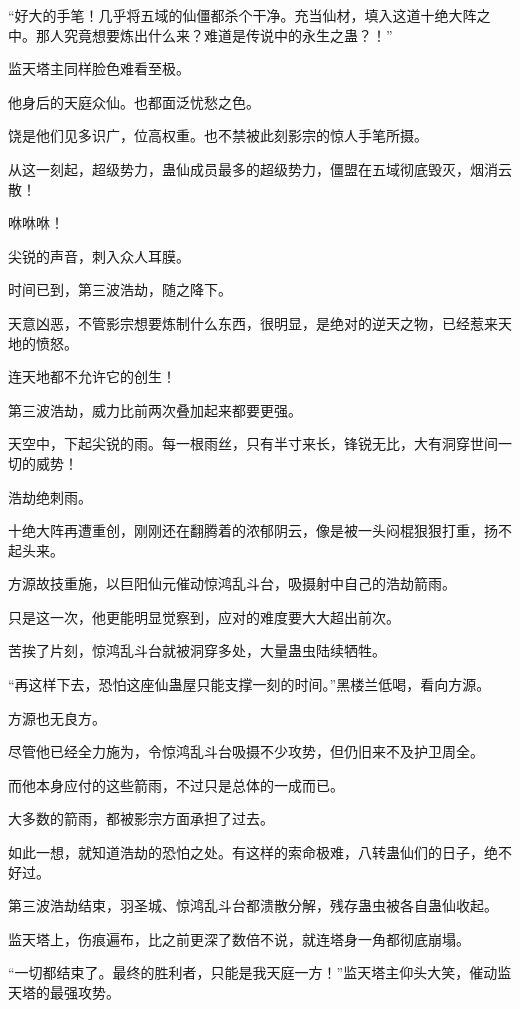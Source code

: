 \begin{this_body}
“好大的手笔！几乎将五域的仙僵都杀个干净。充当仙材，填入这道十绝大阵之中。那人究竟想要炼出什么来？难道是传说中的永生之蛊？！”

监天塔主同样脸色难看至极。

他身后的天庭众仙。也都面泛忧愁之色。

饶是他们见多识广，位高权重。也不禁被此刻影宗的惊人手笔所摄。

从这一刻起，超级势力，蛊仙成员最多的超级势力，僵盟在五域彻底毁灭，烟消云散！

咻咻咻！

尖锐的声音，刺入众人耳膜。

时间已到，第三波浩劫，随之降下。

天意凶恶，不管影宗想要炼制什么东西，很明显，是绝对的逆天之物，已经惹来天地的愤怒。

连天地都不允许它的创生！

第三波浩劫，威力比前两次叠加起来都要更强。

天空中，下起尖锐的雨。每一根雨丝，只有半寸来长，锋锐无比，大有洞穿世间一切的威势！

浩劫绝刺雨。

十绝大阵再遭重创，刚刚还在翻腾着的浓郁阴云，像是被一头闷棍狠狠打重，扬不起头来。

方源故技重施，以巨阳仙元催动惊鸿乱斗台，吸摄射中自己的浩劫箭雨。

只是这一次，他更能明显觉察到，应对的难度要大大超出前次。

苦挨了片刻，惊鸿乱斗台就被洞穿多处，大量蛊虫陆续牺牲。

“再这样下去，恐怕这座仙蛊屋只能支撑一刻的时间。”黑楼兰低喝，看向方源。

方源也无良方。

尽管他已经全力施为，令惊鸿乱斗台吸摄不少攻势，但仍旧来不及护卫周全。

而他本身应付的这些箭雨，不过只是总体的一成而已。

大多数的箭雨，都被影宗方面承担了过去。

如此一想，就知道浩劫的恐怕之处。有这样的索命极难，八转蛊仙们的日子，绝不好过。

第三波浩劫结束，羽圣城、惊鸿乱斗台都溃散分解，残存蛊虫被各自蛊仙收起。

监天塔上，伤痕遍布，比之前更深了数倍不说，就连塔身一角都彻底崩塌。

“一切都结束了。最终的胜利者，只能是我天庭一方！”监天塔主仰头大笑，催动监天塔的最强攻势。


\end{this_body}
